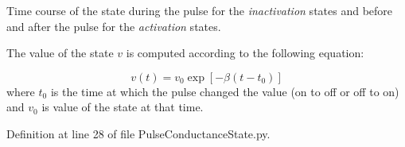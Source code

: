 Time course of the state during the pulse for the {\itshape inactivation} states and before and after the pulse for the {\itshape activation} states. 

The value of the state $v$ is computed according to the following equation\-:

\begin{equation} v(t) = v_0\exp[-\beta(t-t_0)] \end{equation} where $t_0$ is the time at which the pulse changed the value (on to off or off to on) and $v_0$ is value of the state at that time. 

Definition at line 28 of file Pulse\-Conductance\-State.\-py.

